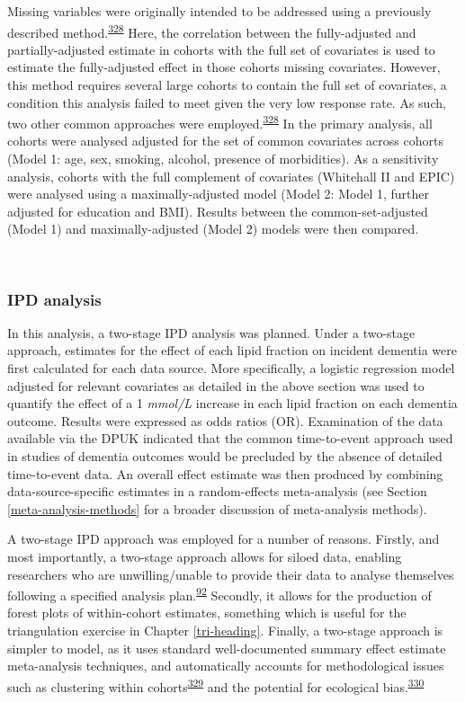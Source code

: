 \documentclass[a4paper, twoside]{templates/ociamthesis}
\begin{document}
Missing variables were originally intended to be addressed using a previously described method.\textsuperscript{\protect\hyperlink{ref-fibrinogenstudiescollaboration2009}{328}} Here, the correlation between the fully-adjusted and partially-adjusted estimate in cohorts with the full set of covariates is used to estimate the fully-adjusted effect in those cohorts missing covariates. However, this method requires several large cohorts to contain the full set of covariates, a condition this analysis failed to meet given the very low response rate. As such, two other common approaches were employed.\textsuperscript{\protect\hyperlink{ref-fibrinogenstudiescollaboration2009}{328}} In the primary analysis, all cohorts were analysed adjusted for the set of common covariates across cohorts (Model 1: age, sex, smoking, alcohol, presence of morbidities). As a sensitivity analysis, cohorts with the full complement of covariates (Whitehall II and EPIC) were analysed using a maximally-adjusted model (Model 2: Model 1, further adjusted for education and BMI). Results between the common-set-adjusted (Model 1) and maximally-adjusted (Model 2) models were then compared.

~

\hypertarget{ipd-analysis}{%
\subsubsection{IPD analysis}\label{ipd-analysis}}

In this analysis, a two-stage IPD analysis was planned. Under a two-stage approach, estimates for the effect of each lipid fraction on incident dementia were first calculated for each data source. More specifically, a logistic regression model adjusted for relevant covariates as detailed in the above section was used to quantify the effect of a 1 \emph{mmol/L} increase in each lipid fraction on each dementia outcome. Results were expressed as odds ratios (OR). Examination of the data available via the DPUK indicated that the common time-to-event approach used in studies of dementia outcomes would be precluded by the absence of detailed time-to-event data. An overall effect estimate was then produced by combining data-source-specific estimates in a random-effects meta-analysis (see Section \ref{meta-analysis-methods} for a broader discussion of meta-analysis methods).

A two-stage IPD approach was employed for a number of reasons. Firstly, and most importantly, a two-stage approach allows for siloed data, enabling researchers who are unwilling/unable to provide their data to analyse themselves following a specified analysis plan.\textsuperscript{\protect\hyperlink{ref-riley2010}{92}} Secondly, it allows for the production of forest plots of within-cohort estimates, something which is useful for the triangulation exercise in Chapter \ref{tri-heading}. Finally, a two-stage approach is simpler to model, as it uses standard well-documented summary effect estimate meta-analysis techniques, and automatically accounts for methodological issues such as clustering within cohorts\textsuperscript{\protect\hyperlink{ref-abo-zaid2013}{329}} and the potential for ecological bias.\textsuperscript{\protect\hyperlink{ref-burke2017}{330}}
\end{document}
